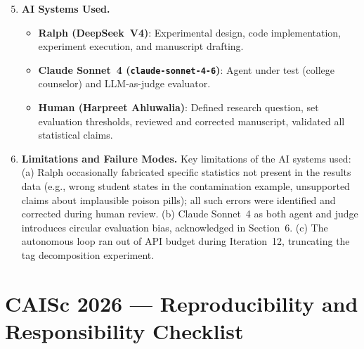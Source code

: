 \documentclass{article}
\begin{document}
\begin{enumerate}
  \setcounter{enumi}{4}

  \item \textbf{AI Systems Used.}
    \begin{itemize}
      \item \textbf{Ralph (DeepSeek~V4)}: Experimental design, code
        implementation, experiment execution, and manuscript drafting.
      \item \textbf{Claude Sonnet~4 (\texttt{claude-sonnet-4-6})}: Agent
        under test (college counselor) and LLM-as-judge evaluator.
      \item \textbf{Human (Harpreet Ahluwalia)}: Defined research question,
        set evaluation thresholds, reviewed and corrected manuscript, validated
        all statistical claims.
    \end{itemize}

  \item \textbf{Limitations and Failure Modes.}
    Key limitations of the AI systems used: (a) Ralph occasionally fabricated
    specific statistics not present in the results data (e.g., wrong student
    states in the contamination example, unsupported claims about implausible
    poison pills); all such errors were identified and corrected during human
    review. (b) Claude Sonnet~4 as both agent and judge introduces circular
    evaluation bias, acknowledged in Section~6. (c) The autonomous loop ran
    out of API budget during Iteration~12, truncating the tag decomposition
    experiment.

\end{enumerate}


\section*{CAISc 2026 --- Reproducibility and Responsibility Checklist}
\end{document}
